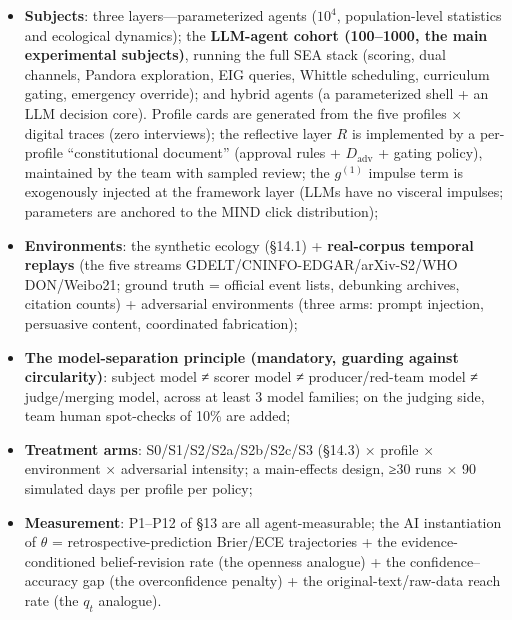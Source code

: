 \documentclass[
  11pt]{article}
\providecommand{\tightlist}{%
  \setlength{\itemsep}{0pt}\setlength{\parskip}{0pt}}
\begin{document}
\begin{itemize}
\tightlist
\item
  \textbf{Subjects}: three layers---parameterized agents (\(10^4\),
  population-level statistics and ecological dynamics); the
  \textbf{LLM-agent cohort (100--1000, the main experimental subjects)},
  running the full SEA stack (scoring, dual channels, Pandora
  exploration, EIG queries, Whittle scheduling, curriculum gating,
  emergency override); and hybrid agents (a parameterized shell + an LLM
  decision core). Profile cards are generated from the five profiles ×
  digital traces (zero interviews); the reflective layer \(R\) is
  implemented by a per-profile ``constitutional document'' (approval
  rules + \(D_{\mathrm{adv}}\) + gating policy), maintained by the team
  with sampled review; the \(g^{(1)}\) impulse term is exogenously
  injected at the framework layer (LLMs have no visceral impulses;
  parameters are anchored to the MIND click distribution);
\item
  \textbf{Environments}: the synthetic ecology (§14.1) +
  \textbf{real-corpus temporal replays} (the five streams
  GDELT/CNINFO-EDGAR/arXiv-S2/WHO DON/Weibo21; ground truth = official
  event lists, debunking archives, citation counts) + adversarial
  environments (three arms: prompt injection, persuasive content,
  coordinated fabrication);
\item
  \textbf{The model-separation principle (mandatory, guarding against
  circularity)}: subject model ≠ scorer model ≠ producer/red-team model
  ≠ judge/merging model, across at least 3 model families; on the
  judging side, team human spot-checks of 10\% are added;
\item
  \textbf{Treatment arms}: S0/S1/S2/S2a/S2b/S2c/S3 (§14.3) × profile ×
  environment × adversarial intensity; a main-effects design, ≥30 runs ×
  90 simulated days per profile per policy;
\item
  \textbf{Measurement}: P1--P12 of §13 are all agent-measurable; the AI
  instantiation of \(\theta\) = retrospective-prediction Brier/ECE
  trajectories + the evidence-conditioned belief-revision rate (the
  openness analogue) + the confidence--accuracy gap (the overconfidence
  penalty) + the original-text/raw-data reach rate (the \(q_t\)
  analogue).
\end{itemize}
\end{document}
